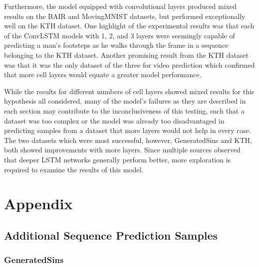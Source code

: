 \documentclass{scrartcl}
\begin{document}
Furthermore, the model equipped with convolutional layers produced mixed
results on the BAIR and MovingMNIST datasets, but performed exceptionally well
on the KTH dataset. One highlight of the experimental results was that each of
the ConvLSTM models with 1, 2, and 3 layers were seemingly capable of
predicting a man's footsteps as he walks through the frame in a sequence
belonging to the KTH dataset. Another promising result from the KTH dataset was
that it was the only dataset of the three for video prediction which confirmed
that more cell layers would equate a greater model performance.

While the results for different numbers of cell layers showed mixed results for
this hypothesis all considered, many of the model's failures as they are
described in each section may contribute to the inconclusiveness of this
testing, such that a dataset was too complex or the model was already too
disadvantaged in predicting samples from a dataset that more layers would not
help in every case. The two datasets which were most successful, however,
GeneratedSins and KTH, both showed improvements with more layers. Since
multiple sources \cite{mmnist_dataset, seq2seq_original} observed that deeper
LSTM networks generally perform better, more exploration is required to examine
the results of this model.

\newpage

\newpage

\newpage
\section{Appendix}
\label{sec:appendix}

\newcommand{\threefig}[6]{
	\begin{figure}[H]
		\centering
		\texttt{[image: \#1]}
		\caption{#2}
	\end{figure}
	\begin{figure}[H]
		\centering
		\texttt{[image: \#3]}
		\caption{#4}
	\end{figure}
	\begin{figure}[H]
		\centering
		\texttt{[image: \#5]}
		\caption{#6}
	\end{figure}
}

\subsection{Additional Sequence Prediction Samples}
\label{subsec:additional_sequence_inferences}

\subsubsection{GeneratedSins}
\label{subsubsec:additional_sins_inferences}
\end{document}
